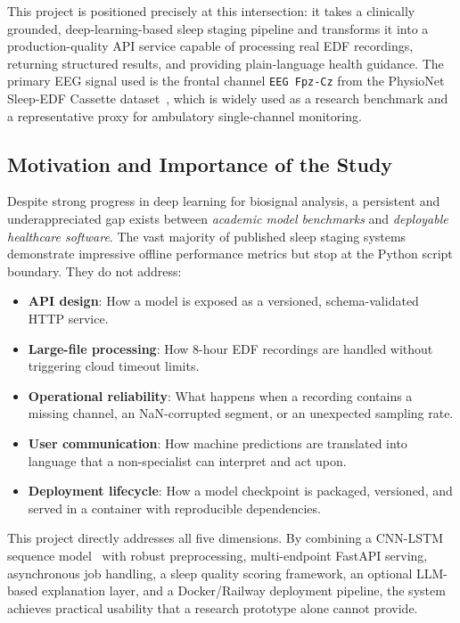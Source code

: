 \documentclass[10pt]{article}
\begin{document}
This project is positioned precisely at this intersection: it takes a clinically grounded, deep-learning-based sleep staging pipeline and transforms it into a production-quality API service capable of processing real EDF recordings, returning structured results, and providing plain-language health guidance. The primary EEG signal used is the frontal channel \texttt{EEG Fpz-Cz} from the PhysioNet Sleep-EDF Cassette dataset~\cite{kemp2000analysis}, which is widely used as a research benchmark and a representative proxy for ambulatory single-channel monitoring.

\subsection{Motivation and Importance of the Study}
\label{sec:motivation}

Despite strong progress in deep learning for biosignal analysis, a persistent and underappreciated gap exists between \textit{academic model benchmarks} and \textit{deployable healthcare software}. The vast majority of published sleep staging systems demonstrate impressive offline performance metrics but stop at the Python script boundary. They do not address:

\begin{itemize}
  \item \textbf{API design}: How a model is exposed as a versioned, schema-validated HTTP service.
  \item \textbf{Large-file processing}: How 8-hour EDF recordings are handled without triggering cloud timeout limits.
  \item \textbf{Operational reliability}: What happens when a recording contains a missing channel, an NaN-corrupted segment, or an unexpected sampling rate.
  \item \textbf{User communication}: How machine predictions are translated into language that a non-specialist can interpret and act upon.
  \item \textbf{Deployment lifecycle}: How a model checkpoint is packaged, versioned, and served in a container with reproducible dependencies.
\end{itemize}

This project directly addresses all five dimensions. By combining a CNN-LSTM sequence model~\cite{supratak2017deepsleepnet} with robust preprocessing, multi-endpoint FastAPI serving, asynchronous job handling, a sleep quality scoring framework, an optional LLM-based explanation layer, and a Docker/Railway deployment pipeline, the system achieves practical usability that a research prototype alone cannot provide.
\end{document}
